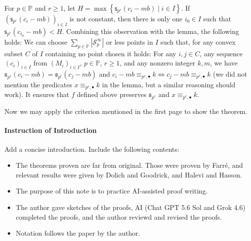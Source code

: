 \documentclass{article}
\theoremstyle{definition}
\theoremstyle{remark}
\theoremstyle{plain}
\begin{document}
For $p \in \mathbb{P}$ and $r \geq 1$, let $H = \max \left\{ \mathsf{s}_{p^r}(c_i - mb) \mid i \in I \right\}$.
If $(\mathsf{s}_{p^r}(c_i - mb))_{i \in I}$ is not constant, then there is only one $i_0 \in I$ such that $\mathsf{s}_{p^r}(c_{i_0} - mb) < H$.
Combining this observation with the lemma, the following holds:
We can choose $\sum_{p \in \mathbb{P}} \left| \mathcal{S}_p^{\infty} \right|$ or less points in $I$ such that, for any convex subset $C$ of $I$ containing no point chosen it holds:
For any $i,j \in C$, any sequence $(c_i)_{i \in I}$ from $(M_i)_{i \in I}$, $p \in \mathbb{P}$, $r \geq 1$, and any nonzero integer $k, m$, we have $\mathfrak{s}_{p^r}(c_i - mb) = \mathfrak{s}_{p^r}(c_j - mb)$ and $c_i - mb \equiv_{p^r, \bullet} k \iff c_j - mb \equiv_{p^r, \bullet} k$ (we did not mention the predicates $x \equiv_{p^r, \bullet} k$ in the lemma, but a similar reasoning should work).
It ensures that $f$ defined above preserves $\mathfrak{s}_{p^r}$ and $x \equiv_{p^r, \bullet} k$.

Now we may apply the criterion mentioned in the first page to show the theorem.

\paragraph{Instruction of Introduction}

Add a concise introduction. Include the following contents:
\begin{itemize}
	\item The theorems proven are far from original. Those were proven by Farré, and relevant results were given by Dolich and Goodrick, and Halevi and Hasson.
	\item The purpose of this note is to practice AI-assisted proof writing.
	\item The author gave sketches of the proofs, AI (Chat GPT 5.6 Sol and Grok 4.6) completed the proofs, and the author reviewd and revised the proofs.
	\item Notation follows the paper by the author.
\end{itemize}


\begin{sloppypar}
	\printbibliography
\end{sloppypar}
\end{document}
